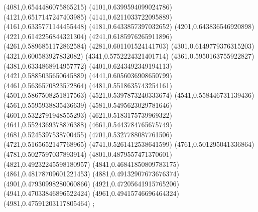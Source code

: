 {(4081,0.6544486075865215)
(4101,0.6399594099024786)
(4121,0.6517147247403985)
(4141,0.6211033722095889)
(4161,0.6335771144455448)
(4181,0.6433857397032652)
(4201,0.643836546920898)
(4221,0.6142256844321304)
(4241,0.6185976265911896)
(4261,0.5896851172862584)
(4281,0.601101524141703)
(4301,0.6149779376315203)
(4321,0.600583927832082)
(4341,0.5752224321401714)
(4361,0.5950163755922827)
(4381,0.6334868914957772)
(4401,0.6243492349194113)
(4421,0.5885035650645889)
(4441,0.6056036908650799)
(4461,0.5636570823572864)
(4481,0.5518635743254161)
(4501,0.5867508251817563)
(4521,0.5397873240333674)
(4541,0.558446731139436)
(4561,0.5595938835436639)
(4581,0.5495623029781646)
(4601,0.5322791948555293)
(4621,0.5183175739969322)
(4641,0.5524369378876388)
(4661,0.5443784765675749)
(4681,0.5245397538700455)
(4701,0.5327788087761506)
(4721,0.5165652147768965)
(4741,0.5261412538641599)
(4761,0.501295041336864)
(4781,0.5027597037893914)
(4801,0.4879557471370601)
(4821,0.49232245598180957)
(4841,0.46841850809783175)
(4861,0.48178709601221453)
(4881,0.49132907673676374)
(4901,0.47930998280060866)
(4921,0.47205641915765206)
(4941,0.47033846896522424)
(4961,0.49415746696464324)
(4981,0.47591203117805464)
};
